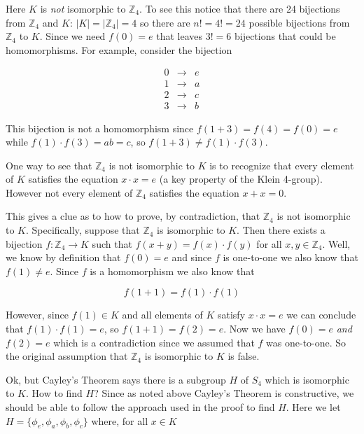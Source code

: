 \documentclass{article}
\theoremstyle{definition}
\begin{document}
\bigskip
\noindent
Here $K$ is \emph{not} isomorphic to $\mathbb{Z}_{4}$. To see this notice that there are 24 bijections from $\mathbb{Z}_4$ and $K$:
$|K| = |\mathbb{Z}_4|  = 4$ so  there are $n! = 4! = 24$ possible bijections from $\mathbb{Z}_4$ to $K$. Since we need 
$f(0) = e$ that leaves $3! = 6$  bijections that could be homomorphisms.  For example, consider the bijection

\begin{equation*}
\begin{array}{ccr}
0 &\longrightarrow&  e \\
1 &\longrightarrow&  a \\
2 &\longrightarrow&  c \\
3 &\longrightarrow&  b 
\end{array}
\end{equation*}

\bigskip
\noindent
This bijection is not a homomorphism since $f(1+3) = f(4) = f(0) = e$ while $f(1) \cdot f(3) = ab = c$, so $f(1+3) \neq f(1) \cdot f(3)$. 

\bigskip
\noindent
One way to see that $\mathbb{Z}_4$ is not isomorphic to $K$ is to recognize that every element of $K$ satisfies the equation $x \cdot x =e$  
(a key property of the Klein 4-group). However not every element of $\mathbb{Z}_4$ satisfies the equation $x + x = 0$. 

\bigskip
\noindent
This gives a clue as to how to prove,  by contradiction,   that $\mathbb{Z}_4$ is not isomorphic to $K$. Specifically,
suppose that $\mathbb{Z}_4$ is isomorphic to $K$. Then there exists a bijection 
$f: \mathbb{Z}_4 \rightarrow K$ such that $f(x + y) = f(x) \cdot f(y)$ for all $x,y \in \mathbb{Z}_4$. Well,
we know by definition that $f(0) = e$ and since $f$ is one-to-one we also know that $f(1) \neq e$. Since 
$f$ is a homomorphism we also know that

\begin{equation*}
f(1+1) = f(1) \cdot f(1)
\end{equation*}


\bigskip
\noindent
However, since $f(1) \in K$ and all elements of $K$ satisfy $x \cdot x = e$ we can conclude that $f(1) \cdot f(1) = e$, so $f(1+1) = f(2) = e$. Now we
have $f(0) = e$ \emph{and}  $f(2) = e$ which is a contradiction since we assumed that  $f$ was one-to-one. So the original assumption that 
$\mathbb{Z}_4$ is isomorphic to $K$ is false.

\bigskip
\noindent
Ok, but Cayley's Theorem says there is a subgroup $H$ of $S_4$ which is isomorphic to $K$. How to find $H$? Since as noted above Cayley's Theorem is constructive,
we should be able to follow the approach used in the proof to find $H$. Here we let $H =\{\phi_{e}, \phi_{a}, \phi_{b}, \phi_{c}\}$ where, for all $x \in K$
\end{document}
